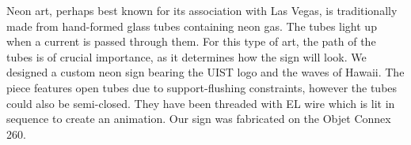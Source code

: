 Neon art, perhaps best known for its association with Las Vegas, is traditionally made from hand-formed glass tubes containing neon gas.  The tubes light up when a current is passed through them.  For this type of art, the path of the tubes is of crucial importance, as it determines how the sign will look.  We designed a custom neon sign bearing the UIST logo and the waves of Hawaii.  The piece features open tubes due to support-flushing constraints, however the tubes could also be semi-closed.  They have been threaded with EL wire which is lit in sequence to create an animation.  Our sign was fabricated on the Objet Connex 260.